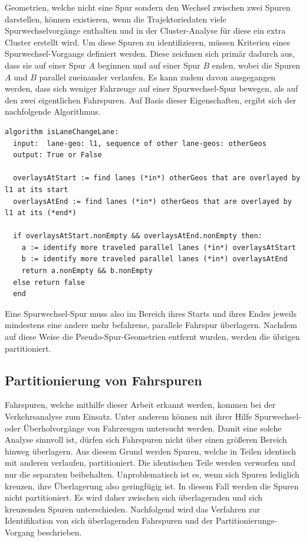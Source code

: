 Geometrien, welche nicht eine Spur sondern den Wechsel zwischen zwei Spuren darstellen, können
existieren, wenn die Trajektoriedaten viele Spurwechselvorgänge enthalten und in der Cluster-Analyse für
diese ein extra Cluster erstellt wird. Um diese Spuren zu identifizieren, müssen Kriterien eines
Spurwechsel-Vorgangs definiert werden. Diese zeichnen sich primär dadurch aus, dass sie auf einer Spur
$A$ beginnen und auf einer Spur $B$ enden, wobei die Spuren $A$ und $B$ parallel zueinander verlaufen.
Es kann zudem davon ausgegangen werden, dass sich weniger Fahrzeuge auf einer Spurwechsel-Spur bewegen,
als auf den zwei eigentlichen Fahrspuren.
Auf Basis dieser Eigenschaften, ergibt sich der nachfolgende Algorithmus.
\begin{lstlisting}[caption=Pseudocode Identifikation Spurwechsel-Spur, language=Pseudo, label=lst:pseudo_isLaneChangeLane]
algorithm isLaneChangeLane:
  input:  lane-geo: l1, sequence of other lane-geos: otherGeos
  output: True or False

  overlaysAtStart := find lanes (*in*) otherGeos that are overlayed by l1 at its start
  overlaysAtEnd := find lanes (*in*) otherGeos that are overlayed by l1 at its (*end*)

  if overlaysAtStart.nonEmpty && overlaysAtEnd.nonEmpty then:
    a := identify more traveled parallel lanes (*in*) overlaysAtStart
    b := identify more traveled parallel lanes (*in*) overlaysAtEnd
    return a.nonEmpty && b.nonEmpty
  else return false
  end
\end{lstlisting}

Eine Spurwechsel-Spur muss also im Bereich ihres Starts und ihres Endes jeweils mindestens eine andere
mehr befahrene, parallele Fahrspur überlagern.
Nachdem auf diese Weise die Pseudo-Spur-Geometrien entfernt wurden, werden die übrigen partitioniert.

\subsection{Partitionierung von Fahrspuren}
\label{sec:real2_lane_partitioning}

Fahrspuren, welche mithilfe dieser Arbeit erkannt werden, kommen bei der Verkehrsanalyse zum Einsatz.
Unter anderem können mit ihrer Hilfe Spurwechsel- oder Überholvorgänge von Fahrzeugen untersucht werden.
Damit eine solche Analyse sinnvoll ist, dürfen sich Fahrspuren nicht über einen größeren Bereich hinweg überlagern.
Aus diesem Grund werden Spuren, welche in Teilen identisch mit anderen verlaufen, partitioniert. Die
identischen Teile werden verworfen und nur die separaten beibehalten.
Unproblematisch ist es, wenn sich Spuren lediglich kreuzen, ihre Überlagerung also geringfügig ist.
In diesem Fall werden die Spuren nicht partitioniert. Es wird daher zwischen sich überlagernden und sich
kreuzenden Spuren unterschieden. Nachfolgend wird das Verfahren zur Identifikation von sich überlagernden
Fahrspuren und der Partitionierungs-Vorgang beschrieben.

